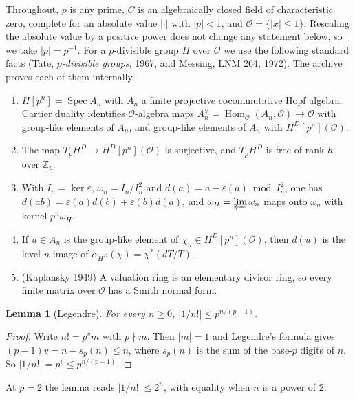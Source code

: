 \documentclass[11pt]{article}
\newtheorem{lemma}[theorem]{Lemma}
\theoremstyle{definition}
\theoremstyle{remark}
\newcommand{\cO}{\mathcal O}
\begin{document}
Throughout, $p$ is any prime, $C$ is an algebraically closed field of characteristic zero, complete for an absolute value $\lvert\cdot\rvert$ with $\lvert p\rvert<1$, and $\cO=\{\lvert x\rvert\le1\}$. Rescaling the absolute value by a positive power does not change any statement below, so we take $\lvert p\rvert=p^{-1}$. For a $p$-divisible group $H$ over $\cO$ we use the following standard facts (Tate, \emph{$p$-divisible groups}, 1967, and Messing, LNM 264, 1972). The archive proves each of them internally.
\begin{enumerate}[label=(F\arabic*),nosep]
\item $H[p^n]=\operatorname{Spec}A_n$ with $A_n$ a finite projective cocommutative Hopf algebra. Cartier duality identifies $\cO$-algebra maps $A_n^\vee=\operatorname{Hom}_\cO(A_n,\cO)\to\cO$ with group-like elements of $A_n$, and group-like elements of $A_n$ with $H^D[p^n](\cO)$.
\item The map $T_pH^D\to H^D[p^n](\cO)$ is surjective, and $T_pH^D$ is free of rank $h$ over $\mathbb Z_p$.
\item With $I_n=\ker\varepsilon$, $\omega_n=I_n/I_n^2$ and $d(a)=a-\varepsilon(a)\bmod I_n^2$, one has $d(ab)=\varepsilon(a)d(b)+\varepsilon(b)d(a)$, and $\omega_H=\varprojlim\omega_n$ maps onto $\omega_n$ with kernel $p^n\omega_H$.
\item If $u\in A_n$ is the group-like element of $\chi_n\in H^D[p^n](\cO)$, then $d(u)$ is the level-$n$ image of $\alpha_{H^D}(\chi)=\chi^*(dT/T)$.
\item (Kaplansky 1949) A valuation ring is an elementary divisor ring, so every finite matrix over $\cO$ has a Smith normal form.
\end{enumerate}

\begin{lemma}[Legendre]\label{lem:leg}
For every $n\ge0$, $\lvert1/n!\rvert\le p^{n/(p-1)}$.
\end{lemma}
\begin{proof}
Write $n!=p^vm$ with $p\nmid m$. Then $\lvert m\rvert=1$ and Legendre's formula gives $(p-1)v=n-s_p(n)\le n$, where $s_p(n)$ is the sum of the base-$p$ digits of $n$. So $\lvert1/n!\rvert=p^v\le p^{n/(p-1)}$.
\end{proof}

At $p=2$ the lemma reads $\lvert1/n!\rvert\le2^n$, with equality when $n$ is a power of $2$.
\end{document}
